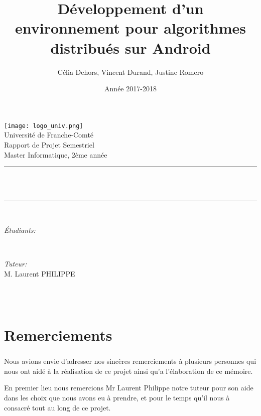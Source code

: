 \documentclass[a4paper,10pt]{report}
\title{Développement d'un environnement pour algorithmes distribués sur Android}
\author{Célia Dehors, Vincent Durand, Justine Romero}
\date{Année 2017-2018}
\makeatletter
\let\thetitle\@title
\let\theauthor\@author
\let\thedate\@date
\makeatother
\begin{document}
  
  \begin{titlepage}
    \centering
    \vspace*{0.5 cm}
    \texttt{[image: logo\_univ.png]}\\[1.0 cm]   %
    \LARGE Université de Franche-Comté\\[2.0 cm]   %
    \Large Rapport de Projet Semestriel\\               %
    \large Master Informatique, 2ème année\\[2.5 cm]               %
    \rule{\linewidth}{0.2 mm} \\[2.5 mm]
    { \huge \bfseries \thetitle}\\
    \rule{\linewidth}{0.2 mm} \\[2.0 cm]
    
    \begin{minipage}{0.6\textwidth}
        \begin{flushleft} \large
            \emph{Étudiants:}\\
            \theauthor
        \end{flushleft}
    \end{minipage}~
    \begin{minipage}{0.4\textwidth}
        \begin{flushleft} \large
            \emph{Tuteur:}\\
            M. Laurent PHILIPPE
        \end{flushleft}
    \end{minipage}\\[3.0 cm]
    {\large \thedate}\\[2 cm]
    \vfill
    
\end{titlepage}
\chapter*{Remerciements}
\paragraph{}
Nous avions envie d'adresser nos sincères remerciements à plusieurs personnes qui nous ont aidé à la réalisation de ce projet ainsi qu'a l'élaboration de ce mémoire.


En premier lieu nous remercions Mr Laurent Philippe notre tuteur pour son aide dans les choix que nous avons eu à prendre, et pour le temps qu'il nous à consacré tout au long de ce projet.
\end{document}
